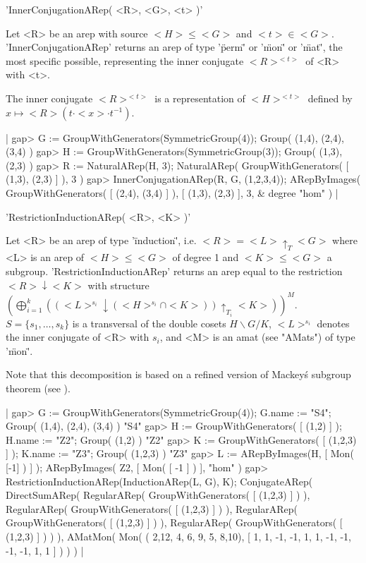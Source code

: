 
'InnerConjugationARep( <R>, <G>, <t> )'

Let <R> be an arep with source $<H>\leq <G>$ and $<t>\in <G>$. 
'InnerConjugationARep' returns an arep of type 
'\"perm\"' or '\"mon\"' or '\"mat\"', the most specific 
possible, representing the inner conjugate $<R>^{<t>}$ 
of <R> with <t>.

The inner conjugate $<R>^{<t>}$ is a representation of $<H>^{<t>}$
defined by $x\mapsto <R>(t\cdot <x>\cdot t^{-1})$.

|    gap> G := GroupWithGenerators(SymmetricGroup(4));
    Group( (1,4), (2,4), (3,4) )
    gap> H := GroupWithGenerators(SymmetricGroup(3));
    Group( (1,3), (2,3) )
    gap> R := NaturalARep(H, 3);
    NaturalARep( GroupWithGenerators( [ (1,3), (2,3) ] ), 3 )
    gap> InnerConjugationARep(R, G, (1,2,3,4));
    ARepByImages(
      GroupWithGenerators( [ (2,4), (3,4) ] ),
      [ (1,3), (2,3) ],
      3, & degree
      "hom"
    ) |


'RestrictionInductionARep( <R>, <K> )'

Let <R> be an arep of type '\"induction\"', i.e. 
$<R> = <L>\uparrow_T <G>$ where <L> is an arep of $<H>\leq <G>$ of
degree 1 and $<K> \leq <G>$ a subgroup.
'RestrictionInductionARep' returns an arep equal to the
restriction $<R>\downarrow <K>$ with structure 
$\left(\bigoplus_{i=1}^k
((<L>^{s_i}\downarrow(<H>^{s_i}\cap <K>))\uparrow_{T_i} <K>)\right)^M$.
$S = \{s_1,\dots, s_k\}$ is a transversal of the double cosets
$H\backslash G/K$, $<L>^{s_i}$ denotes the inner conjugate of <R>
with $s_i$, and <M> is an amat (see "AMats") of type '\"mon\"'.

Note that this decomposition is based on a refined version
of Mackey\'s subgroup theorem (see \cite{Pue99}).

|    gap> G := GroupWithGenerators(SymmetricGroup(4)); G.name := "S4";
    Group( (1,4), (2,4), (3,4) )
    "S4"
    gap> H := GroupWithGenerators( [ (1,2) ] ); H.name := "Z2";
    Group( (1,2) )
    "Z2"
    gap> K := GroupWithGenerators( [ (1,2,3) ] ); K.name := "Z3";
    Group( (1,2,3) )
    "Z3"
    gap> L := ARepByImages(H, [ Mon( [-1] ) ] );
    ARepByImages(
      Z2,
      [ Mon( [ -1 ] )
      ],
      "hom"
    )
    gap> RestrictionInductionARep(InductionARep(L, G), K);
    ConjugateARep(
      DirectSumARep(
        RegularARep( GroupWithGenerators( [ (1,2,3) ] ) ),
        RegularARep( GroupWithGenerators( [ (1,2,3) ] ) ),
        RegularARep( GroupWithGenerators( [ (1,2,3) ] ) ),
        RegularARep( GroupWithGenerators( [ (1,2,3) ] ) )
      ),
      AMatMon( Mon(
        ( 2,12, 4, 6, 9, 5, 8,10),
        [ 1, 1, -1, -1, 1, 1, -1, -1, -1, -1, 1, 1 ]
      ) )
    ) |

